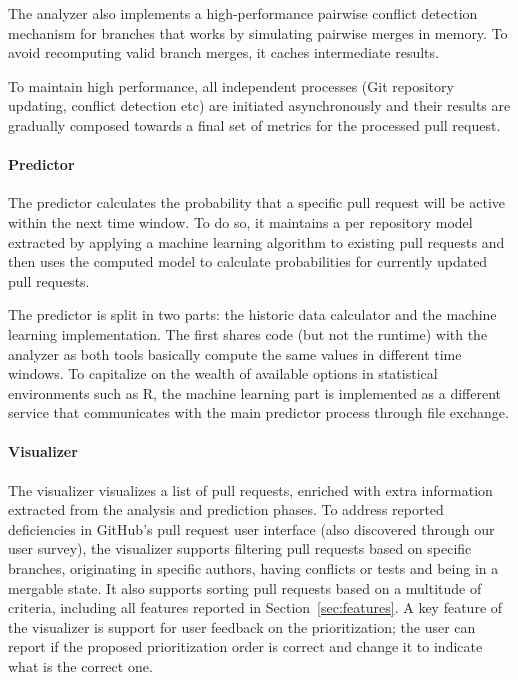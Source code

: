 \documentclass[conference]{IEEEtran}
\begin{document}
The analyzer also implements a high-performance pairwise conflict detection
mechanism for branches that works by simulating pairwise merges in memory. To
avoid recomputing valid branch merges, it caches intermediate results.

To maintain high performance, all independent processes (Git repository
updating, conflict detection etc) are initiated asynchronously and their
results are gradually composed towards a final set of metrics for the processed
pull request.

\paragraph{Predictor}
The predictor calculates the probability that a specific pull request will
be active within the next time window. To do so, it maintains a per repository
model extracted by applying a machine learning algorithm to existing pull
requests and then uses the computed model to calculate probabilities for
currently updated pull requests.

The predictor is split in two parts: the historic data calculator and
the machine learning implementation. The first shares code (but not the
runtime) with the analyzer as both tools basically compute the same
values in different time windows. To capitalize on the wealth of available
options in statistical environments such as R, the machine learning
part is implemented as a different service that communicates with the
main predictor process through file exchange.

\paragraph{Visualizer}

The visualizer visualizes a list of pull requests, enriched with extra
information extracted from the analysis and prediction phases.  To address
reported deficiencies in GitHub's pull request user interface (also discovered
through our user survey), the visualizer supports filtering pull requests based
on specific branches, originating in specific authors, having conflicts or tests
and being in a mergable state.  It also supports sorting pull requests based on
a multitude of criteria, including all features reported in
Section~\ref{sec:features}.  A key feature of the visualizer is support for user
feedback on the prioritization; the user can report if the proposed
prioritization order is correct and change it to indicate what is the correct
one. 
\end{document}
